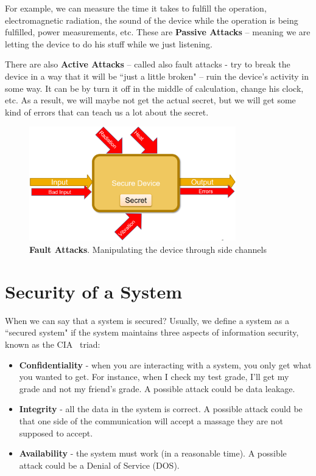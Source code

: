For example, we can measure the time it takes to fulfill the operation,
electromagnetic radiation, the sound of the device while the operation is being
fulfilled, power measurements, etc. These are \textbf{Passive Attacks} – meaning
we are letting the device to do his stuff while we just listening.

There are also \textbf{Active Attacks} – called also fault attacks -  try to
break the device in a way that it will be ``just a little broken" – ruin the
device's activity in some way. It can be by turn it off in the middle of
calculation, change his clock, etc. As a result, we will maybe not get the
actual secret, but we will get some kind of errors that can teach us a lot about
the secret. 

\begin{figure}[!ht]
    \centering
    \includegraphics[width=0.8\textwidth]{images/ch1_Intro/Secure_device3.png}
    \caption{\textbf{Fault Attacks}. Manipulating the device through side channels}
    \label{fig:SecDev3}
\end{figure}

\section{Security of a System} \label{sec:SystemSecurity}

When we can say that a system is secured? Usually, we define a system as a
``secured system" if the system maintains three aspects of information security,
known as the CIA~\cite{cia} triad:

\begin{itemize}
    \item \textbf{Confidentiality} - when you are interacting with a system, you
    only get what you wanted to get. For instance, when I check my test grade,
    I'll get my grade and not my friend's grade. A possible attack could be data
    leakage.
    \item \textbf{Integrity} - all the data in the system is correct. A possible
    attack could be that one side of the communication will accept a massage
    they are not supposed to accept.
    \item \textbf{Availability} - the system must work (in a reasonable time). A
    possible attack could be a Denial of Service (DOS).
\end{itemize}

